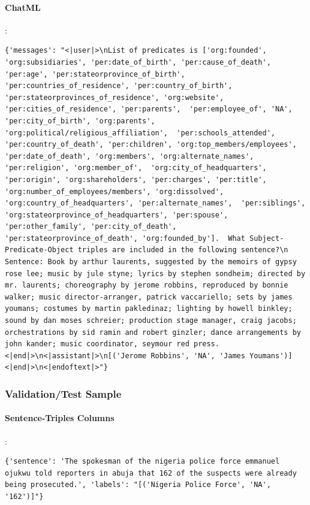 \documentclass{article}
\begin{document}
\paragraph{ChatML}:
\begin{lstlisting}
{'messages': "<|user|>\nList of predicates is ['org:founded', 'org:subsidiaries', 'per:date_of_birth', 'per:cause_of_death',  'per:age', 'per:stateorprovince_of_birth', 'per:countries_of_residence', 'per:country_of_birth',  'per:stateorprovinces_of_residence', 'org:website', 'per:cities_of_residence', 'per:parents',  'per:employee_of', 'NA', 'per:city_of_birth', 'org:parents', 'org:political/religious_affiliation',  'per:schools_attended', 'per:country_of_death', 'per:children', 'org:top_members/employees',  'per:date_of_death', 'org:members', 'org:alternate_names', 'per:religion', 'org:member_of',  'org:city_of_headquarters', 'per:origin', 'org:shareholders', 'per:charges', 'per:title',  'org:number_of_employees/members', 'org:dissolved', 'org:country_of_headquarters', 'per:alternate_names',  'per:siblings', 'org:stateorprovince_of_headquarters', 'per:spouse', 'per:other_family', 'per:city_of_death',  'per:stateorprovince_of_death', 'org:founded_by'].  What Subject-Predicate-Object triples are included in the following sentence?\n Sentence: Book by arthur laurents, suggested by the memoirs of gypsy rose lee; music by jule styne; lyrics by stephen sondheim; directed by mr. laurents; choreography by jerome robbins, reproduced by bonnie walker; music director-arranger, patrick vaccariello; sets by james youmans; costumes by martin pakledinaz; lighting by howell binkley; sound by dan moses schreier; production stage manager, craig jacobs; orchestrations by sid ramin and robert ginzler; dance arrangements by john kander; music coordinator, seymour red press.<|end|>\n<|assistant|>\n[('Jerome Robbins', 'NA', 'James Youmans')]<|end|>\n<|endoftext|>"}
\end{lstlisting}
\subsubsection{Validation/Test Sample}
\paragraph{Sentence-Triples Columns}:
\begin{lstlisting}
{'sentence': 'The spokesman of the nigeria police force emmanuel ojukwu told reporters in abuja that 162 of the suspects were already being prosecuted.', 'labels': "[('Nigeria Police Force', 'NA', '162')]"}
\end{lstlisting}
\end{document}
